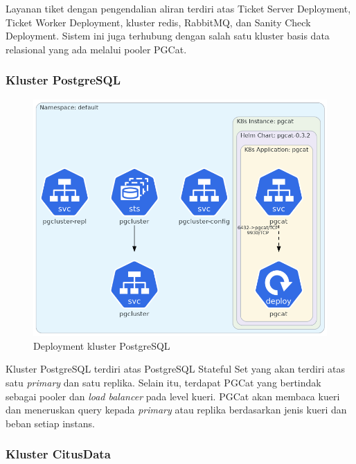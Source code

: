 Layanan tiket dengan pengendalian aliran terdiri atas Ticket Server Deployment, Ticket Worker Deployment, kluster redis, RabbitMQ, dan Sanity Check Deployment. Sistem ini juga terhubung dengan salah satu kluster basis data relasional yang ada melalui pooler PGCat.

\pagebreak

\subsubsection{Kluster PostgreSQL}

\begin{figure}[htbp]
    \centering
    \includegraphics[width=1\textwidth]{resources/chapter-4/postgres.png}
    \caption{Deployment kluster PostgreSQL}
    \label{fig:deployment-postgres}
\end{figure}

Kluster PostgreSQL terdiri atas PostgreSQL Stateful Set yang akan terdiri atas satu \textit{primary} dan satu replika. Selain itu, terdapat PGCat yang bertindak sebagai pooler dan \textit{load balancer} pada level kueri. PGCat akan membaca kueri dan meneruskan query kepada \textit{primary} atau replika berdasarkan jenis kueri dan beban setiap instans.

\pagebreak

\subsubsection{Kluster CitusData}

